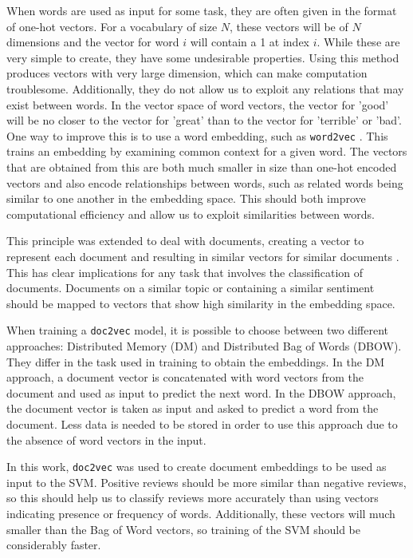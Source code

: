 \documentclass[twocolumn]{article}
\begin{document}
When words are used as input for some task, they are often given in the format of one-hot vectors. For a vocabulary of size $N$, these vectors will be of $N$ dimensions and the vector for word $i$ will contain a 1 at index $i$. While these are very simple to create, they have some undesirable properties. Using this method produces vectors with very large dimension, which can make computation troublesome. Additionally, they do not allow us to exploit any relations that may exist between words. In the vector space of word vectors, the vector for 'good' will be no closer to the vector for 'great' than to the vector for 'terrible' or 'bad'. One way to improve this is to use a word embedding, such as \texttt{word2vec} \cite{NIPS2013_5021}. This trains an embedding by examining common context for a given word. The vectors that are obtained from this are both much smaller in size than one-hot encoded vectors and also encode relationships between words, such as related words being similar to one another in the embedding space. This should both improve computational efficiency and allow us to exploit similarities between words.

This principle was extended to deal with documents, creating a vector to represent each document and resulting in similar vectors for similar documents \cite{doc2vec}. This has clear implications for any task that involves the classification of documents. Documents on a similar topic or containing a similar sentiment should be mapped to vectors that show high similarity in the embedding space.

When training a \texttt{doc2vec} model, it is possible to choose between two different approaches: Distributed Memory (DM) and Distributed Bag of Words (DBOW). They differ in the task used in training to obtain the embeddings. In the DM approach, a document vector is concatenated with word vectors from the document and used as input to predict the next word. In the DBOW approach, the document vector is taken as input and asked to predict a word from the document. Less data is needed to be stored in order to use this approach due to the absence of word vectors in the input.

In this work, \texttt{doc2vec} was used to create document embeddings to be used as input to the SVM. Positive reviews should be more similar than negative reviews, so this should help us to classify reviews more accurately than using vectors indicating presence or frequency of words. Additionally, these vectors will much smaller than the Bag of Word vectors, so training of the SVM should be considerably faster.
\end{document}
